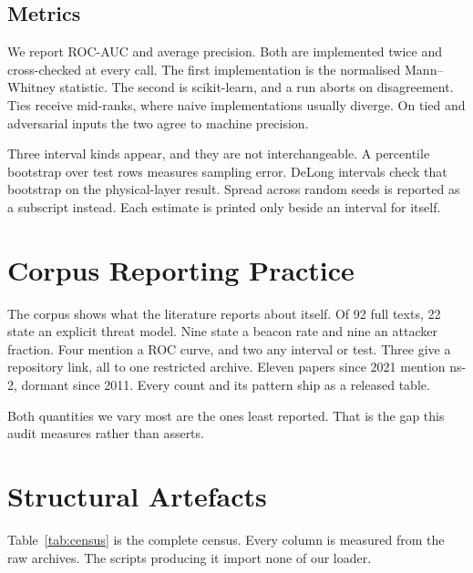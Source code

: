 \documentclass[journal,twoside]{IEEEtran}
\begin{document}
\subsection{Metrics}

We report ROC-AUC and average precision.
Both are implemented twice and cross-checked at every call.
The first implementation is the normalised Mann--Whitney statistic.
The second is scikit-learn, and a run aborts on disagreement.
Ties receive mid-ranks, where naive implementations usually diverge.
On tied and adversarial inputs the two agree to machine precision.

Three interval kinds appear, and they are not interchangeable.
A percentile bootstrap over test rows measures sampling error.
DeLong intervals check that bootstrap on the physical-layer result.
Spread across random seeds is reported as a subscript instead.
Each estimate is printed only beside an interval for itself.

\section{Corpus Reporting Practice}

The corpus shows what the literature reports about itself.
Of 92 full texts, 22 state an explicit threat model.
Nine state a beacon rate and nine an attacker fraction.
Four mention a ROC curve, and two any interval or test.
Three give a repository link, all to one restricted archive.
Eleven papers since 2021 mention ns-2, dormant since 2011.
Every count and its pattern ship as a released table.

Both quantities we vary most are the ones least reported.
That is the gap this audit measures rather than asserts.

\section{Structural Artefacts}

Table~\ref{tab:census} is the complete census.
Every column is measured from the raw archives.
The scripts producing it import none of our loader.
\end{document}
